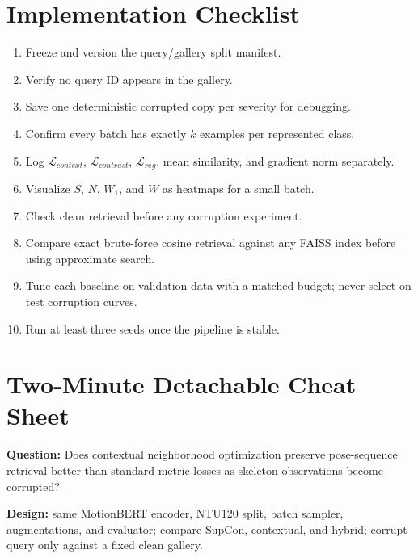 \documentclass[11pt,oneside,openany]{book}
\theoremstyle{myplain}
\theoremstyle{definition}
\begin{document}
\chapter{Implementation Checklist}

\begin{meetingbox}[title=Before the first real run]
\begin{enumerate}[leftmargin=*,itemsep=3pt]
  \item Freeze and version the query/gallery split manifest.
  \item Verify no query ID appears in the gallery.
  \item Save one deterministic corrupted copy per severity for debugging.
  \item Confirm every batch has exactly $k$ examples per represented class.
  \item Log $\mathcal L_{context}$, $\mathcal L_{contrast}$, $\mathcal L_{reg}$, mean similarity, and gradient norm separately.
  \item Visualize $S$, $N$, $W_1$, and $W$ as heatmaps for a small batch.
  \item Check clean retrieval before any corruption experiment.
  \item Compare exact brute-force cosine retrieval against any FAISS index before using approximate search.
  \item Tune each baseline on validation data with a matched budget; never select on test corruption curves.
  \item Run at least three seeds once the pipeline is stable.
\end{enumerate}
\end{meetingbox}

\chapter{Two-Minute Detachable Cheat Sheet}

\begin{tcolorbox}[enhanced,breakable,colback=mist,colframe=navy,title=Core proposition,fonttitle=\bfseries]
\textbf{Question:} Does contextual neighborhood optimization preserve pose-sequence retrieval better than standard metric losses as skeleton observations become corrupted?

\textbf{Design:} same MotionBERT encoder, NTU120 split, batch sampler, augmentations, and evaluator; compare SupCon, contextual, and hybrid; corrupt query only against a fixed clean gallery.
\end{tcolorbox}
\end{document}
